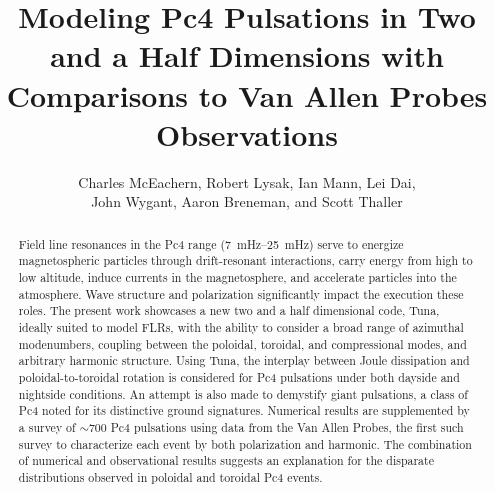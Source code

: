 \documentclass{article}
\newcommand{\about}{\ensuremath{\sim}}
\begin{document}
\title{Modeling Pc4 Pulsations in Two and a Half Dimensions with Comparisons to Van Allen Probes Observations}

\author{
    Charles McEachern,
    Robert Lysak,
    Ian Mann,
    Lei Dai, \\
    John Wygant,
    Aaron Breneman, and
    Scott Thaller
}




\maketitle


\begin{abstract}

Field line resonances in the Pc4 range (\SIrange{7}{25}{\mHz}) serve to energize magnetospheric particles through drift-resonant interactions, carry energy from high to low altitude, induce currents in the magnetosphere, and accelerate particles into the atmosphere. Wave structure and polarization significantly impact the execution these roles. The present work showcases a new two and a half dimensional code, Tuna, ideally suited to model FLRs, with the ability to consider a broad range of azimuthal modenumbers, coupling between the poloidal, toroidal, and compressional modes, and arbitrary harmonic structure. Using Tuna, the interplay between Joule dissipation and poloidal-to-toroidal rotation is considered for Pc4 pulsations under both dayside and nightside conditions. An attempt is also made to demystify giant pulsations, a class of Pc4 noted for its distinctive ground signatures. Numerical results are supplemented by a survey of \about700 Pc4 pulsations using data from the Van Allen Probes, the first such survey to characterize each event by both polarization and harmonic. The combination of numerical and observational results suggests an explanation for the disparate distributions observed in poloidal and toroidal Pc4 events.

\end{abstract}

\end{document}
